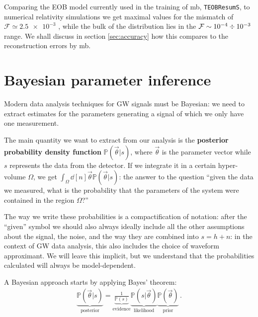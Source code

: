 \documentclass[main.tex]{subfiles}
\begin{document}
Comparing the \ac{EOB} model currently used in the training of \ac{mb}, \texttt{TEOBResumS}, to numerical relativity simulations we get maximal values for the mismatch of \(\mathcal{F} \simeq \num{2.5e-3}\) \cite[fig.\ 1]{nagarTimedomainEffectiveonebodyGravitational2018}, while the bulk of the distribution lies in the \(\mathcal{F} \sim \num{e-4} \divisionsymbol \num{e-3}\) range.
We shall discuss in section \ref{sec:accuracy} how this compares to the reconstruction errors by \ac{mb}.

\section{Bayesian parameter inference} \label{sec:bayesian}

Modern data analysis techniques for \ac{GW} signals must be Bayesian: we need to extract estimates for the parameters generating a signal of which we only have one measurement. 

The main quantity we want to extract from our analysis is the \textbf{posterior probability density function} \(\mathbb{P}(\vec{\theta} | s)\), where \(\vec{\theta}\) is the parameter vector while \(s\) represents the data from the detector. 
If we integrate it in a certain hyper-volume \(\Omega \), we get \(\int_{\Omega } \dd[n]{\vec{\theta}} \mathbb{P}(\vec{\theta} | s)\): the answer to the question ``given the data we measured, what is the probability that the parameters of the system were contained in the region \(\Omega \)?''

The way we write these probabilities is a compactification of notation: 
after the ``given'' symbol we should also always ideally include all the other assumptions about the signal, the noise, and the way they are combined into \(s = h + n\): in the context of \ac{GW} data analysis, this also includes the choice of waveform approximant. 
We will leave this implicit, but we understand that the probabilities calculated will always be model-dependent. 

A Bayesian approach starts by applying Bayes' theorem: 
%
\begin{align}
\underbrace{\mathbb{P}(\vec{\theta}| s )}_{\text{posterior}} = \underbrace{\frac{1}{\mathbb{P}(s)}}_{\text{evidence}} \underbrace{\mathbb{P}(s | \vec{\theta})}_{\text{likelihood}} \underbrace{\mathbb{P}(\vec{\theta})}_{\text{prior}}
\,.
\end{align}
%
\end{document}
